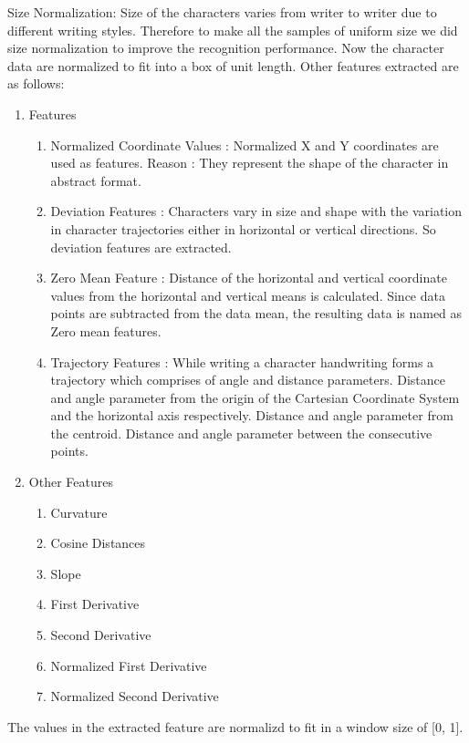 Size Normalization:
Size of the characters varies from writer to writer due to different writing styles. Therefore to make all the samples of uniform size we did size normalization to improve the recognition performance. Now the character data are normalized to fit into a box of unit length.
Other features extracted are as follows:
\begin{enumerate}
	\item Features
	\begin{enumerate}
		\item Normalized Coordinate Values : Normalized X and Y coordinates are used as features.
		Reason : They represent the shape of the character in abstract format.
		
		\item Deviation Features : Characters vary in size and shape with the variation in character trajectories either in horizontal or vertical directions. So deviation features are extracted.
		
		\item Zero Mean Feature : Distance of the horizontal and vertical coordinate values from the horizontal and vertical means is calculated. Since data points are subtracted from the data mean, the resulting data is named as Zero mean features.
		
		\item Trajectory Features : While writing a character handwriting forms a trajectory which comprises of angle and distance parameters.
		Distance and angle parameter from the origin of the Cartesian Coordinate System and the horizontal axis respectively.
		Distance and angle parameter from the centroid.
		Distance and angle parameter between the consecutive points.
	\end{enumerate}
	\item Other Features
	\begin{enumerate}
		\item Curvature
		\item Cosine Distances
		\item Slope
		\item First Derivative
		\item Second Derivative
		\item Normalized First Derivative
		\item Normalized Second Derivative
	\end{enumerate}
\end{enumerate}
The values in the extracted feature are normalizd to fit in a window size of [0, 1].




